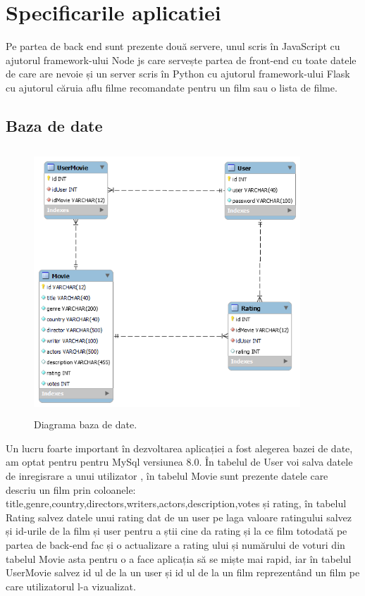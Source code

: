 \chapter{ Specificarile aplicatiei}
\label{chap:ch5}

\par Pe partea de back end sunt prezente două servere, unul scris în JavaScript cu ajutorul framework-ului Node js care servește partea de front-end cu toate datele de care are nevoie și un server scris în Python cu ajutorul framework-ului Flask cu ajutorul căruia aflu filme recomandate pentru un film sau o lista de filme.

\section{Baza de date}
\label{sec:ch5sec1}

\begin{figure}[htbp]
\centerline{\includegraphics[width=10cm, height=10cm]{figures/diagrama db.png}}
\caption{Diagrama baza de date.}
\label{fig}
\end{figure}

\par Un lucru foarte important în dezvoltarea aplicației a fost alegerea bazei de date, am optat pentru pentru MySql versiunea 8.0. În tabelul de User voi salva datele de inregisrare a unui utilizator , în tabelul Movie sunt prezente datele care descriu un film prin coloanele: title,genre,country,directors,writers,actors,description,votes și rating, în tabelul Rating salvez datele unui rating dat de un user pe laga valoare ratingului salvez și id-urile de la film și user pentru a știi cine da rating și la ce film totodată pe partea de back-end fac și o actualizare a rating ului și numărului de voturi din tabelul Movie asta pentru o a face aplicația să se miște mai rapid, iar în tabelul UserMovie salvez id ul de la un user și id ul de la un film reprezentând un film pe care utilizatorul l-a vizualizat.

